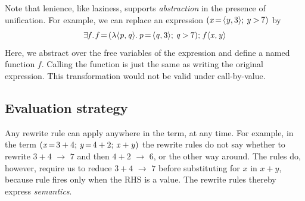 \documentclass[acmsmall]{acmart}
\newcommand{\Varid}[1]{\mathit{#1}}
\begin{document}
Note that lenience, like laziness, supports \emph{abstraction} in the presence of unification.
For example, we can replace an expression \ensuremath{(\Varid{x}\hspace{-0.14em}=\hspace{-0.14em}\langle{}\Varid{y},\mathrm{3}\rangle;\,\Varid{y}\mathbin{>}\mathrm{7})} by
$$
\ensuremath{\exists\Varid{f}.\,\Varid{f}\hspace{-0.14em}=\hspace{-0.14em}(\lambda\langle{}\Varid{p},\Varid{q}\rangle.\,\Varid{p}\hspace{-0.14em}=\hspace{-0.14em}\langle{}\Varid{q},\mathrm{3}\rangle;\,\Varid{q}\mathbin{>}\mathrm{7});\,\Varid{f}\langle\Varid{x},\Varid{y}\rangle}
$$
Here, we abstract over the free variables of the expression and define a named function \ensuremath{\Varid{f}}.
Calling the function is just the same as writing the original expression.
This transformation would not be valid under call-by-value.


\subsection{Evaluation strategy} \label{sec:eval-strategy}

Any rewrite rule can apply anywhere in the term, at any time.  For example, in the term \ensuremath{(\Varid{x}\hspace{-0.14em}=\hspace{-0.14em}\mathrm{3}\mathbin{+}\mathrm{4};\,\Varid{y}\hspace{-0.14em}=\hspace{-0.14em}\mathrm{4}\mathbin{+}\mathrm{2};\,\Varid{x}\mathbin{+}\Varid{y})}
the rewrite rules do not say whether to rewrite \ensuremath{\mathrm{3}\mathbin{+}\mathrm{4}} $\rightarrow$ \ensuremath{\mathrm{7}} and then \ensuremath{\mathrm{4}\mathbin{+}\mathrm{2}} $\rightarrow$ \ensuremath{\mathrm{6}},
or the other way around.
The rules do, however, require us to reduce \ensuremath{\mathrm{3}\mathbin{+}\mathrm{4}} $\rightarrow$ \ensuremath{\mathrm{7}} before substituting for \ensuremath{\Varid{x}} in \ensuremath{\Varid{x}\mathbin{+}\Varid{y}}, because
rule  fires only when the RHS is a value.
The rewrite rules thereby express \emph{semantics}.
\end{document}
